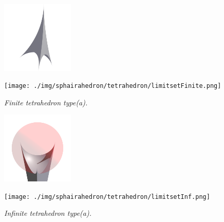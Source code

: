 \documentclass[suppldata, dvipdfmx]{interact}
\theoremstyle{plain}%
\theoremstyle{definition}
\theoremstyle{remark}
\theoremstyle{problemstyle}
\begin{document}
\begin{figure}[H]
 \begin{minipage}{0.5\textwidth}
  \begin{minipage}[t]{0.24\textwidth}
   \centering
   \includegraphics[width=1.35in, height=1.35in, keepaspectratio]{./img/sphairahedron/tetrahedron/sphairahedronFinite.png}
  \end{minipage}
  \hspace*{\fill}
  \begin{minipage}[t]{0.24\textwidth}
   \centering
   \texttt{[image: ./img/sphairahedron/tetrahedron/limitsetFinite.png]}
  \end{minipage}
  \hspace*{\fill}
  \caption{\textit{Finite tetrahedron type(a).}}
  \label{fig:tetrahedronFinite}
 \end{minipage}
 \hspace*{\fill}
 \begin{minipage}{0.5\textwidth}
  \begin{minipage}[t]{0.24\textwidth}
   \centering
   \includegraphics[width=1.35in, height=1.35in, keepaspectratio]{./img/sphairahedron/tetrahedron/sphairahedronInf.png}
  \end{minipage}
  \hspace*{\fill}
  \begin{minipage}[t]{0.24\textwidth}
   \centering
   \texttt{[image: ./img/sphairahedron/tetrahedron/limitsetInf.png]}
  \end{minipage}
  \hspace*{\fill}
  \caption{\textit{Infinite tetrahedron type(a).}}
  \label{fig:tetrahedronInf}
 \end{minipage}
\end{figure}
\end{document}

